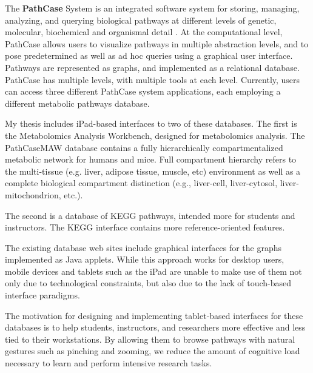 The \textbf{PathCase} System is an integrated software system for storing,
managing, analyzing, and querying biological pathways at different levels of
genetic, molecular, biochemical and organismal detail \cite{pathcase-basic}. At
the computational level, PathCase allows users to visualize pathways in multiple
abstraction levels, and to pose predetermined as well as ad hoc queries using a
graphical user interface. Pathways are represented as graphs, and implemented as
a relational database. PathCase has multiple levels, with multiple tools at each
level. Currently, users can access three different PathCase system applications,
each employing a different metabolic pathways database.

My thesis includes iPad-based interfaces to two of these databases. The first is
the Metabolomics Analysis Workbench, designed for metabolomics analysis.  The
PathCaseMAW database contains a fully hierarchically compartmentalized metabolic
network for humans and mice. Full compartment hierarchy refers to the
multi-tissue (e.g.  liver, adipose tissue, muscle, etc) environment as well as a
complete biological compartment distinction (e.g., liver-cell, liver-cytosol,
liver-mitochondrion, etc.).

The second is a database of KEGG pathways, intended more for students and
instructors. The KEGG interface contains more reference-oriented features.

The existing database web sites include graphical interfaces for the graphs
implemented as Java applets. While this approach works for desktop users, mobile
devices and tablets such as the iPad are unable to make use of them not only due
to technological constraints, but also due to the lack of touch-based interface
paradigms.

The motivation for designing and implementing tablet-based interfaces for these
databases is to help students, instructors, and researchers more effective and
less tied to their workstations. By allowing them to browse pathways with
natural gestures such as pinching and zooming, we reduce the amount of cognitive
load necessary to learn and perform intensive research tasks.
